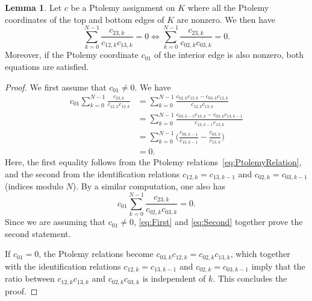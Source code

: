 \documentclass[11pt]{amsart}
\theoremstyle{plain}
\theoremstyle{definition}
\newtheorem{lemma}[theorem]{Lemma}
\numberwithin{equation}{section}
\begin{document}
\begin{lemma}\label{lemma:edgeRelationEquivalence}
Let $c$ be a Ptolemy assignment on $K$ where all the Ptolemy coordinates of the top and bottom edges of $K$ are nonzero. We then have
\begin{equation}\label{eq:EdgeRelations}
\sum_{k=0}^{N-1} \frac{c_{23,k}}{c_{12,k}c_{13,k}}=0\iff\sum_{k=0}^{N-1}\frac{c_{23,k}}{c_{02,k}c_{03,k}}=0.
\end{equation}
Moreover, if the Ptolemy coordinate $c_{01}$ of the interior edge is also nonzero, both equations are satisfied. %
\end{lemma}
\begin{proof}
We first assume that $c_{01}\neq 0$. We have
\begin{equation}\label{eq:First}
\begin{aligned}
c_{01}\sum_{k=0}^{N-1} \frac{c_{23,k}}{c_{12,k}c_{13,k}}&=\sum_{k=0}^{N-1} \frac{c_{02,k}c_{13,k}-c_{03,k}c_{12,k}}{c_{12,k}c_{13,k}}\\
&=\sum_{k=0}^{N-1} \frac{c_{03,k-1}c_{13,k}-c_{03,k}c_{13,k-1}}{c_{13,k-1}c_{13,k}}\\
&=\sum_{k=0}^{N-1}\Big(\frac{c_{03,k-1}}{c_{13,k-1}}-\frac{c_{03,k}}{c_{13,k}}\big)\\
&=0.
\end{aligned}
\end{equation}
Here, the first equality follows from the Ptolemy relations~\eqref{eq:PtolemyRelation}, and the second from the identification relations $c_{12,k}=c_{13,k-1}$ and $c_{02,k}=c_{03,k-1}$ (indices modulo $N$). By a similar computation, one also has
\begin{equation}\label{eq:Second}
c_{01}\sum_{k=0}^{N-1} \frac{c_{23,k}}{c_{02,k}c_{03,k}}=0.
\end{equation}
Since we are assuming that $c_{01}\neq 0$, \eqref{eq:First} and \eqref{eq:Second} together prove the second statement.

If $c_{01}=0$, the Ptolemy relations become $c_{03,k}c_{12,k}=c_{02,k}c_{13,k}$, which together with the identification relations $c_{12,k}=c_{13,k-1}$ and $c_{02,k}=c_{03,k-1}$ imply that the ratio between $c_{12,k}c_{13,k}$ and $c_{02,k}c_{03,k}$ is independent of $k$. This concludes the proof.
\end{proof}
\end{document}
